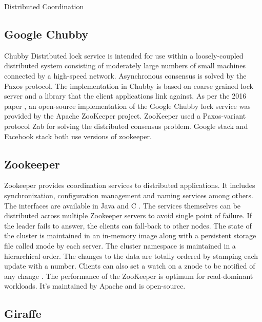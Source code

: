 Distributed Coordination


\subsection{ Google Chubby}

     Chubby Distributed lock service \cite{www-chubby}
     is intended for use within a loosely-coupled distributed system
     consisting of moderately large numbers of small machines
     connected by a high-speed network. Asynchronous consensus is
     solved by the Paxos protocol. The implementation in Chubby is
     based on coarse grained lock server and a library that the client
     applications link against.  As per the 2016 paper
     \cite{chubby-paper-2016}, an open-source implementation of the
     Google Chubby lock service was provided by the Apache ZooKeeper
     project. ZooKeeper used a Paxos-variant protocol Zab for solving
     the distributed consensus problem.  Google stack and Facebook
     stack both use versions of zookeeper.
     
\subsection{ Zookeeper}
 
     Zookeeper provides coordination services to distributed applications.
     It includes synchronization, configuration management and naming
     services among others. The interfaces are available in Java and C
     \cite{www-zoo-overiew}. The services themselves can be distributed
     across multiple Zookeeper servers to avoid single point of failure.
     If the leader fails to answer, the clients can fall-back to other
     nodes. The state of the cluster is maintained in an in-memory image
     along with a persistent storage file called znode by each server. The
     cluster namespace is maintained in a hierarchical order. The changes to the
     data are totally ordered \cite{www-zoo-wiki} by stamping each update
     with a number. Clients can also set a watch on a znode to be notified
     of any change \cite{www-zoo-ibm}. The performance of the ZooKeeper
     is optimum for read-dominant workloads. It's maintained by Apache
     and is open-source.

\subsection{ Giraffe}

